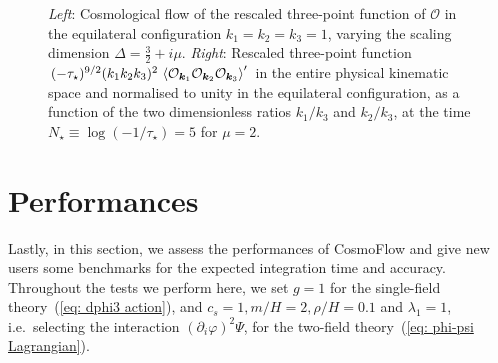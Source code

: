 \documentclass[11pt]{article}
\numberwithin{equation}{section} %
\def \O {\mathcal{O}}
\begin{document}
\begin{figure}[h!]
  \centering
  \hspace*{0.2cm}
  \vspace*{0.2cm}
  \caption{\textit{Left}: Cosmological flow of the rescaled three-point function of $\O$ in the equilateral configuration $k_1=k_2=k_3=1$, varying the scaling dimension $\Delta = \tfrac{3}{2} + i\mu$. \textit{Right}: Rescaled three-point function $(-\tau_\star)^{9/2}(k_1 k_2 k_3)^2\,\braket{\O_{\bm{k}_1} \O_{\bm{k}_2} \O_{\bm{k}_3}}'$ in the entire physical kinematic space and normalised to unity in the equilateral configuration, as a function of the two dimensionless ratios $k_1/k_3$ and $k_2/k_3$, at the time $N_\star \equiv \log(-1/\tau_\star) = 5$ for $\mu = 2$.}
  \label{fig: Triple-H}
\end{figure}


\section{Performances}
\label{sec: Performances}

Lastly, in this section, we assess the performances of \textsf{CosmoFlow} and give new users some benchmarks for the expected integration time and accuracy. Throughout the tests we perform here, we set $g=1$ for the single-field theory~(\ref{eq: dphi3 action}), and $c_s=1, m/H = 2, \rho/H = 0.1$ and $\lambda_1 = 1$, i.e.~selecting the interaction $(\partial_i \varphi)^2\Psi$, for the two-field theory~(\ref{eq: phi-psi Lagrangian}).
\end{document}
